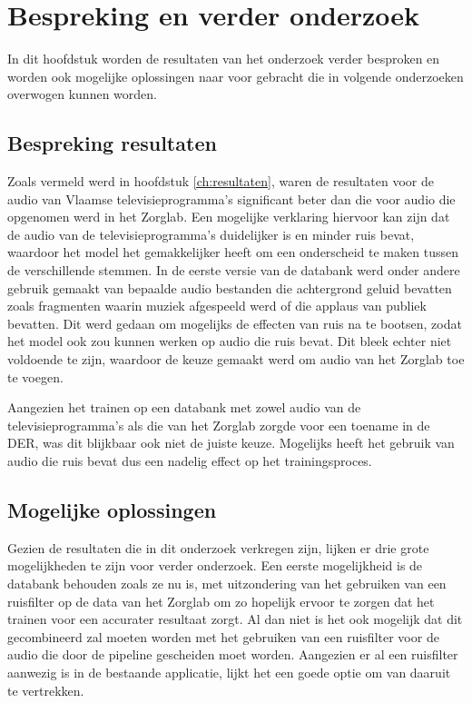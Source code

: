 
\chapter{Bespreking en verder onderzoek}
\label{ch:bespreking}
In dit hoofdstuk worden de resultaten van het onderzoek verder besproken en worden ook mogelijke oplossingen naar voor gebracht die in volgende onderzoeken overwogen kunnen worden.

\section{Bespreking resultaten}
\label{sec:bespr-res}
Zoals vermeld werd in hoofdstuk \ref{ch:resultaten}, waren de resultaten voor de audio van Vlaamse televisieprogramma's significant beter dan die voor audio die opgenomen werd in het Zorglab. Een mogelijke verklaring hiervoor kan zijn dat de audio van de televisieprogramma's duidelijker is en minder ruis bevat, waardoor het model het gemakkelijker heeft om een onderscheid te maken tussen de verschillende stemmen. In de eerste versie van de databank werd onder andere gebruik gemaakt van bepaalde audio bestanden die achtergrond geluid bevatten zoals fragmenten waarin muziek afgespeeld werd of die applaus van publiek bevatten. Dit werd gedaan om mogelijks de effecten van ruis na te bootsen, zodat het model ook zou kunnen werken op audio die ruis bevat. Dit bleek echter niet voldoende te zijn, waardoor de keuze gemaakt werd om audio van het Zorglab toe te voegen.

Aangezien het trainen op een databank met zowel audio van de televisieprogramma's als die van het Zorglab zorgde voor een toename in de DER, was dit blijkbaar ook niet de juiste keuze. Mogelijks heeft het gebruik van audio die ruis bevat dus een nadelig effect op het trainingsproces. 

\section{Mogelijke oplossingen}
\label{sec:opl}
Gezien de resultaten die in dit onderzoek verkregen zijn, lijken er drie grote mogelijkheden te zijn voor verder onderzoek. Een eerste mogelijkheid is de databank behouden zoals ze nu is, met uitzondering van het gebruiken van een ruisfilter op de data van het Zorglab om zo hopelijk ervoor te zorgen dat het trainen voor een accurater resultaat zorgt. Al dan niet is het ook mogelijk dat dit gecombineerd zal moeten worden met het gebruiken van een ruisfilter voor de audio die door de pipeline gescheiden moet worden. Aangezien er al een ruisfilter aanwezig is in de bestaande applicatie, lijkt het een goede optie om van daaruit te vertrekken.

